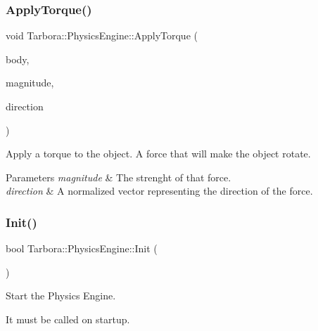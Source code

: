 \subsubsection{\texorpdfstring{Apply\+Torque()}{ApplyTorque()}}
{\footnotesize\ttfamily void Tarbora\+::\+Physics\+Engine\+::\+Apply\+Torque (\begin{DoxyParamCaption}\item[{bt\+Rigid\+Body $\ast$}]{body,  }\item[{float}]{magnitude,  }\item[{const glm\+::vec3 \&}]{direction }\end{DoxyParamCaption})\hspace{0.3cm}{\ttfamily [static]}}



Apply a torque to the object. A force that will make the object rotate. 


\begin{DoxyParams}{Parameters}
{\em magnitude} & The strenght of that force. \\
\hline
{\em direction} & A normalized vector representing the direction of the force. \\
\hline
\end{DoxyParams}
\mbox{\label{classTarbora_1_1PhysicsEngine_a7ec00bd287d1366ce059f2821b023634}} 
\subsubsection{\texorpdfstring{Init()}{Init()}}
{\footnotesize\ttfamily bool Tarbora\+::\+Physics\+Engine\+::\+Init (\begin{DoxyParamCaption}{ }\end{DoxyParamCaption})\hspace{0.3cm}{\ttfamily [static]}}



Start the Physics Engine. 

It must be called on startup. \mbox{\label{classTarbora_1_1PhysicsEngine_a4debfab1c812e22ccd4f65b0b7e9cea7}} 
